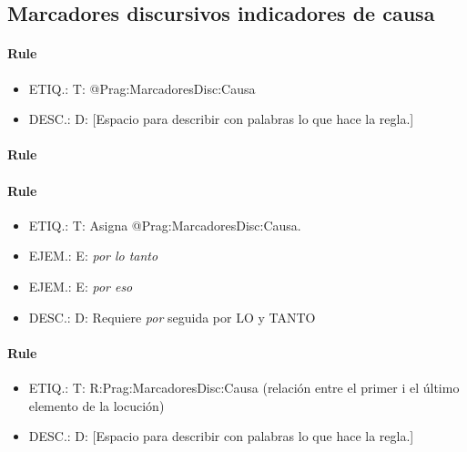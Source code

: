 \documentclass[11pt]{report}
\begin{document}
\subsection{Marcadores discursivos indicadores de causa}
\paragraph*{Rule}
\begin{itemize}
\item ETIQ.:  T: @Prag:MarcadoresDisc:Causa
\item DESC.:  D: [Espacio para describir con palabras lo que hace la regla.]
\end{itemize}

\paragraph*{Rule}
\paragraph*{Rule}
\begin{itemize}
\item ETIQ.:  T: Asigna @Prag:MarcadoresDisc:Causa.
\item EJEM.:  E: \emph{por lo tanto}
\item EJEM.:  E: \emph{por eso}
\item DESC.:  D: Requiere \emph{por} seguida por LO y TANTO
\end{itemize}

\paragraph*{Rule}
\begin{itemize}
\item ETIQ.:  T: R:Prag:MarcadoresDisc:Causa (relación entre el primer i el último elemento de la locución)
\item DESC.:  D: [Espacio para describir con palabras lo que hace la regla.]
\end{itemize}
\end{document}
